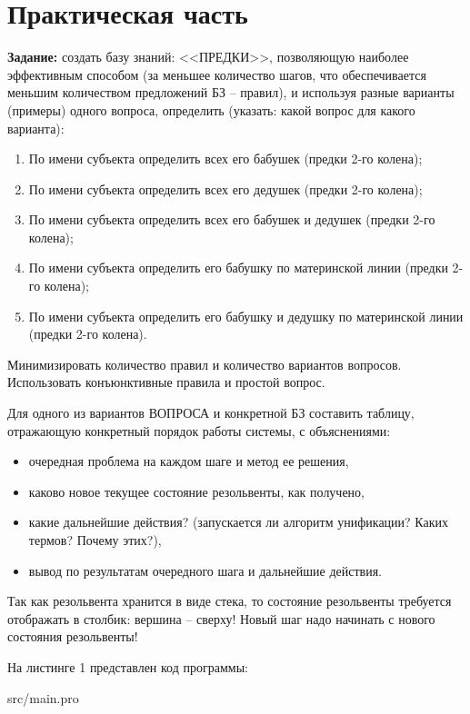 \chapter*{Практическая часть}
\textbf{Задание:} создать базу знаний: <<ПРЕДКИ>>, позволяющую наиболее эффективным способом (за меньшее количество шагов, что обеспечивается меньшим количеством предложений БЗ – правил), и используя разные варианты (примеры) одного вопроса, определить (указать: какой вопрос для какого варианта):

\begin{enumerate}
	\item По имени субъекта определить всех его бабушек (предки 2-го колена);
	\item По имени субъекта определить всех его дедушек (предки 2-го колена);
	\item По имени субъекта определить всех его бабушек и дедушек (предки 2-го колена);
	\item По имени субъекта определить его бабушку по материнской линии (предки 2-го колена);
	\item По имени субъекта определить его бабушку и дедушку по материнской линии (предки 2-го колена).
\end{enumerate}

Минимизировать количество правил и количество вариантов вопросов. Использовать конъюнктивные правила и простой вопрос.

Для одного из вариантов ВОПРОСА и конкретной БЗ составить таблицу, отражающую конкретный порядок работы системы, с объяснениями:

\begin{itemize}
	\item очередная проблема на каждом шаге и метод ее решения,
	\item каково новое текущее состояние резольвенты, как получено,
	\item какие дальнейшие действия? (запускается ли алгоритм унификации? Каких термов? Почему этих?),
	\item вывод по результатам очередного шага и дальнейшие действия.
\end{itemize}

Так как резольвента хранится в виде стека, то состояние резольвенты требуется отображать в столбик: вершина – сверху! Новый шаг надо начинать с нового состояния резольвенты!

На листинге 1 представлен код программы:

\FloatBarrier
\begin{lstinputlisting}[style={lsp}]{src/main.pro}
\end{lstinputlisting}
\FloatBarrier

